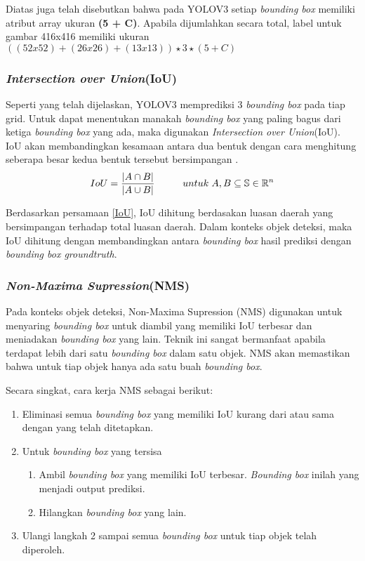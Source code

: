 \documentclass[../thesis.tex]{subfiles}
\begin{document}
Diatas juga telah disebutkan bahwa pada YOLOV3 setiap \textit{bounding box} memiliki atribut array ukuran \textbf{(5 + C)}. Apabila dijumlahkan secara total, label untuk gambar 416x416 memiliki ukuran $((52x52)+(26x26)+(13x13))\star 3 \star (5+C)$

\subsubsection{\textit{Intersection over Union}(IoU)}
Seperti yang telah dijelaskan, YOLOV3 memprediksi 3 \textit{bounding box} pada tiap grid. Untuk dapat menentukan manakah \textit{bounding box} yang paling bagus dari ketiga \textit{bounding box} yang ada, maka digunakan \textit{Intersection over Union}(IoU). 
IoU akan membandingkan kesamaan antara dua bentuk dengan cara menghitung seberapa besar kedua bentuk tersebut bersimpangan \cite{IoU}.
\begin{equation} \label{IoU}
	IoU = \frac{|A \cap B|}{|A \cup B|}	\hspace{10mm} untuk \hspace{1mm}A,B \subseteq \mathbb{S} \in \mathbb{R}^n
\end{equation}

Berdasarkan persamaan \ref{IoU}, IoU dihitung berdasakan luasan daerah yang bersimpangan terhadap total luasan daerah.
Dalam konteks objek deteksi, maka IoU dihitung dengan membandingkan antara \textit{bounding box} hasil prediksi dengan \textit{bounding box groundtruth}.

\subsubsection{\textit{Non-Maxima Supression}(NMS)}
Pada konteks objek deteksi, Non-Maxima Supression (NMS) digunakan untuk menyaring \textit{bounding box} untuk diambil yang memiliki IoU terbesar dan meniadakan \textit{bounding box} yang lain. 
Teknik ini sangat bermanfaat apabila terdapat lebih dari satu \textit{bounding box} dalam satu objek. NMS akan memastikan bahwa untuk tiap objek hanya ada satu buah \textit{bounding box}. 

Secara singkat, cara kerja NMS sebagai berikut:
\begin{enumerate}
	\item Eliminasi semua \textit{bounding box} yang memiliki IoU kurang dari atau sama dengan yang telah ditetapkan.
	\item Untuk \textit{bounding box} yang tersisa
	\begin{enumerate}
		\item Ambil \textit{bounding box} yang memiliki IoU terbesar. \textit{Bounding box} inilah yang menjadi output prediksi.
		\item Hilangkan \textit{bounding box} yang lain.
	\end{enumerate}
	\item Ulangi langkah 2 sampai semua \textit{bounding box} untuk tiap objek telah diperoleh.
\end{enumerate}
\end{document}
